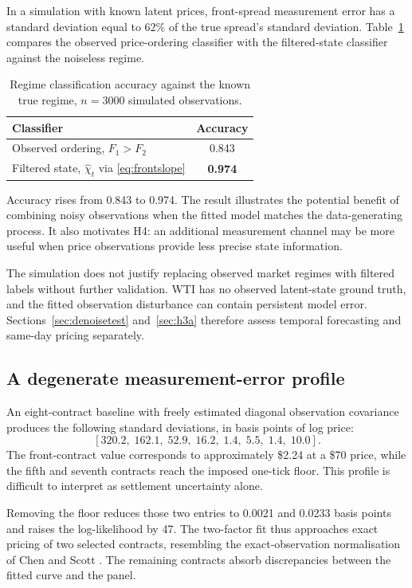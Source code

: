 \documentclass[journal]{IEEEtran}
\begin{document}
In a simulation with known latent prices, front-spread measurement error has a standard deviation equal to 62\% of the true spread's standard deviation. Table~\ref{tab:denoise} compares the observed price-ordering classifier with the filtered-state classifier against the noiseless regime.
\begin{table}[H]
\centering
\caption{Regime classification accuracy against the known true regime, $n = 3000$ simulated observations.}
\label{tab:denoise}
\small
\renewcommand{\arraystretch}{1.2}
\begin{tabular}{@{}lc@{}}
\toprule
\textbf{Classifier} & \textbf{Accuracy} \\
\midrule
Observed ordering, $F_1 > F_2$ & 0.843 \\
Filtered state, $\hat{\chi}_t$ via \eqref{eq:frontslope} & \textbf{0.974} \\
\bottomrule
\end{tabular}
\end{table}

Accuracy rises from 0.843 to 0.974. The result illustrates the potential benefit of combining noisy observations when the fitted model matches the data-generating process. It also motivates H4: an additional measurement channel may be more useful when price observations provide less precise state information.

The simulation does not justify replacing observed market regimes with filtered labels without further validation. WTI has no observed latent-state ground truth, and the fitted observation disturbance can contain persistent model error. Sections~\ref{sec:denoisetest} and~\ref{sec:h3a} therefore assess temporal forecasting and same-day pricing separately.

\subsection{A degenerate measurement-error profile}
\label{sec:firstcontact}

An eight-contract baseline with freely estimated diagonal observation covariance produces the following standard deviations, in basis points of log price:
\[
[320.2,\;162.1,\;52.9,\;16.2,\;1.4,\;5.5,\;1.4,\;10.0].
\]
The front-contract value corresponds to approximately \$2.24 at a \$70 price, while the fifth and seventh contracts reach the imposed one-tick floor. This profile is difficult to interpret as settlement uncertainty alone.

Removing the floor reduces those two entries to 0.0021 and 0.0233 basis points and raises the log-likelihood by 47. The two-factor fit thus approaches exact pricing of two selected contracts, resembling the exact-observation normalisation of Chen and Scott \cite{ChenScott1993}. The remaining contracts absorb discrepancies between the fitted curve and the panel.
\end{document}
